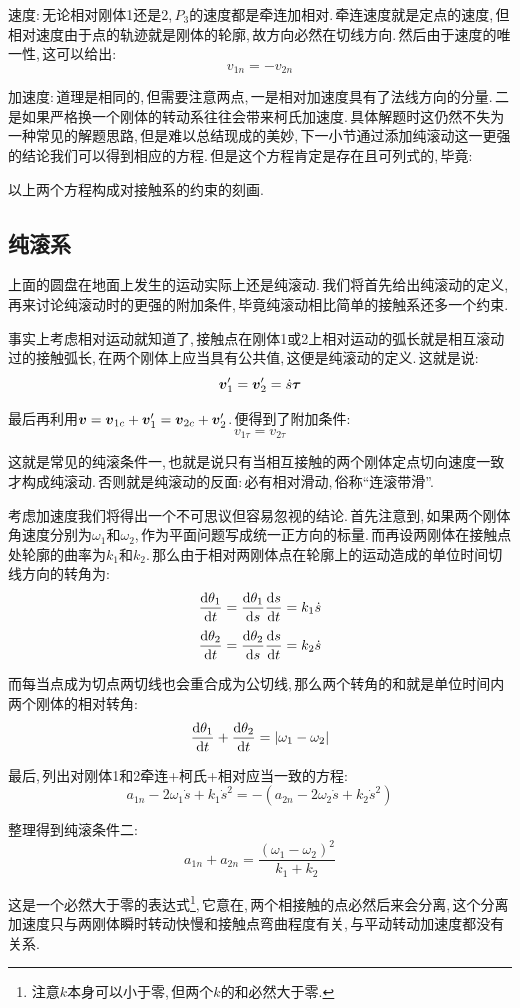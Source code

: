 速度:\,无论相对刚体1还是2,\,$P_3$的速度都是牵连加相对.\,牵连速度就是定点的速度,\,但相对速度由于点的轨迹就是刚体的轮廓,\,故方向必然在切线方向.\,然后由于速度的唯一性,\,这可以给出:
\[v_{1n}=-v_{2n}\]

加速度:\,道理是相同的,\,但需要注意两点,\,一是相对加速度具有了法线方向的分量.\,二是如果严格换一个刚体的转动系往往会带来柯氏加速度.\,具体解题时这仍然不失为一种常见的解题思路,\,但是难以总结现成的美妙,\,下一小节通过添加纯滚动这一更强的结论我们可以得到相应的方程.\,但是这个方程肯定是存在且可列式的,\,毕竟:

以上两个方程构成对接触系的约束的刻画.

\subsection{纯滚系}
上面的圆盘在地面上发生的运动实际上还是纯滚动.\,我们将首先给出纯滚动的定义,\,再来讨论纯滚动时的更强的附加条件,\,毕竟纯滚动相比简单的接触系还多一个约束.

事实上考虑相对运动就知道了,\,接触点在刚体1或2上相对运动的弧长就是相互滚动过的接触弧长,\,在两个刚体上应当具有公共值,\,这便是纯滚动的定义.\,这就是说:
\[\boldsymbol{v}_1'=\boldsymbol{v}_2'=\dot{s}\boldsymbol{\tau}\]

最后再利用$\boldsymbol{v}=\boldsymbol{v}_{1c}+\boldsymbol{v}_1'=\boldsymbol{v}_{2c}+\boldsymbol{v}_2'$.\,便得到了附加条件:
\[v_{1\tau}=v_{2\tau}\]

这就是常见的纯滚条件一,\,也就是说只有当相互接触的两个刚体定点切向速度一致才构成纯滚动.\,否则就是纯滚动的反面:\,必有相对滑动,\,俗称``连滚带滑''.

考虑加速度我们将得出一个不可思议但容易忽视的结论.\,首先注意到,\,如果两个刚体角速度分别为$\omega_1$和$\omega_2$,\,作为平面问题写成统一正方向的标量.\,而再设两刚体在接触点处轮廓的曲率为$k_1$和$k_2$.\,那么由于相对两刚体点在轮廓上的运动造成的单位时间切线方向的转角为:
\[\frac{\textrm{d}\theta_1}{\textrm{d} t}=\frac{\textrm{d}\theta_1}{\textrm{d} s}\frac{\textrm{d} s}{\textrm{d} t}=k_1\dot{s}\]
\[\frac{\textrm{d}\theta_2}{\textrm{d} t}=\frac{\textrm{d}\theta_2}{\textrm{d} s}\frac{\textrm{d} s}{\textrm{d} t}=k_2\dot{s}\]

而每当点成为切点两切线也会重合成为公切线,\,那么两个转角的和就是单位时间内两个刚体的相对转角:
\[\frac{\textrm{d}\theta_1}{\textrm{d} t}+\frac{\textrm{d}\theta_2}{\textrm{d} t}=|\omega_1-\omega_2|\]

最后,\,列出对刚体1和2牵连+柯氏+相对应当一致的方程:
\[a_{1n}-2\omega_1 \dot{s}+k_1\dot{s}^2=-(a_{2n}-2\omega_2\dot{s}+k_2\dot{s}^2)\]

整理得到纯滚条件二:
\[a_{1n}+a_{2n}=\frac{(\omega_1-\omega_2)^2}{k_1+k_2}\]

这是一个必然大于零的表达式\footnote{注意$k$本身可以小于零,\,但两个$k$的和必然大于零.},\,它意在,\,两个相接触的点必然后来会分离,\,这个分离加速度只与两刚体瞬时转动快慢和接触点弯曲程度有关,\,与平动转动加速度都没有关系.

